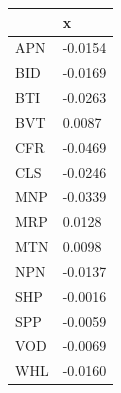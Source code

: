 \documentclass[11pt,preprint, authoryear]{elsarticle}
\let\origtable\table
\let\endorigtable\endtable
\renewenvironment{table}[1][2] {
    \expandafter\origtable\expandafter[H]
} {
    \endorigtable
}
\numberwithin{equation}{section}
\numberwithin{figure}{section}
\numberwithin{table}{section}
\begin{document}
\begin{table}[H]

\caption{\label{tab:Alpha_I}Factor Alpha's: Industrial}
\centering
\begin{tabular}[t]{l|l}
\hline
  & x\\
\hline
APN & -0.0154\\
\hline
BID & -0.0169\\
\hline
BTI & -0.0263\\
\hline
BVT & 0.0087\\
\hline
CFR & -0.0469\\
\hline
CLS & -0.0246\\
\hline
MNP & -0.0339\\
\hline
MRP & 0.0128\\
\hline
MTN & 0.0098\\
\hline
NPN & -0.0137\\
\hline
SHP & -0.0016\\
\hline
SPP & -0.0059\\
\hline
VOD & -0.0069\\
\hline
WHL & -0.0160\\
\hline
\end{tabular}
\end{table}
\end{document}
